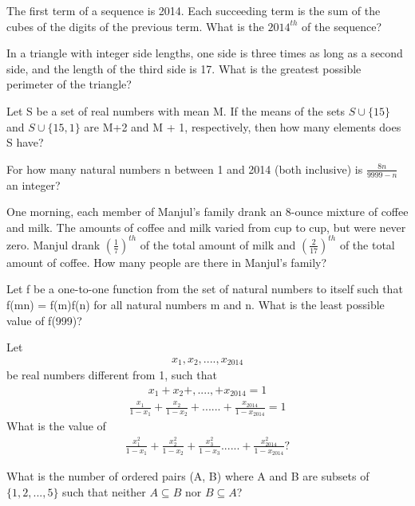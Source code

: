\item The first term of a sequence is 2014. Each succeeding term is the sum of the cubes of the digits of the previous term. What is the $2014^{th}$ of the sequence?

\item In a triangle with integer side lengths, one side is three times as long as a second side, and the length of the third side is 17. What is the greatest possible perimeter of the triangle? 

\item Let S be a set of real numbers with mean M. If the means of the sets $S \cup \{15\}$ and $S \cup \{15,1\}$ are M+2 and M + 1, respectively, then how many elements does S have?

\item For how many natural numbers n between 1 and 2014 (both inclusive) is $\frac{8n}{9999-n}$ an integer?

\item One morning, each member of Manjul's family drank an 8-ounce mixture of coffee and milk. The amounts of coffee and milk varied from cup to cup, but were never zero. Manjul drank $(\frac{1}{7})^{th}$ of the total amount of milk and 
$(\frac{2}{17})^{th}$ of the total amount of coffee. How many people are there in Manjul's family?

\item Let f be a one-to-one function from the set of natural numbers to itself such that f(mn) = f(m)f(n) for all natural numbers m and n. What is the least possible value of f(999)?

\item Let 
\begin{align*}
x_{1}, x_{2},....,x_{2014}
\end{align*}
be real numbers different from 1, such that 
\begin{align*}
x_{1} + x_{2} +,....,+ x_{2014} = 1
\end{align*} 
\begin{align*}
\frac{x_1}{1 - x_1} + \frac{x_2}{1 - x_2} +...... + \frac{x_{2014}}{1 - x_{2014}} = 1
\end{align*}
What is the value of  
\begin{align*}
\frac{x_1^2}{1 - x_1} + \frac{x_2^2}{1 - x_2} + \frac{x_3^2}{1 - x_3}...... + \frac{x^2_{2014}}{1 - x_{2014}}?
\end{align*}

\item What is the number of ordered pairs (A, B) where A and B are subsets of $\{1,2,...,5\}$ such that neither 
$A \subseteq B$ nor $B \subseteq A$?


